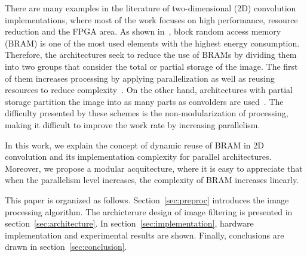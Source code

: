 \documentclass[conference,compsoc]{IEEEtran}
\begin{document}
There are many examples in the literature of two-dimensional (2D) convolution
implementations, where most of the work focuses on high performance, resource
reduction and the FPGA area. As shown in~\cite{paper3}, block random access
memory (BRAM) is one of the most used elements with the highest energy
consumption. Therefore, the architectures seek to reduce the use of BRAMs by
dividing them into two groups that consider the total or partial storage of the
image. The first of them increases processing by applying parallelization as
well as reusing resources to reduce complexity~\cite{paper1,paper5}. On the
other hand, architectures with partial storage partition the image into as many
parts as convolders are used~\cite{paper2,paper4}. The difficulty presented by
these schemes is the non-modularization of processing, making it difficult to
improve the work rate by increasing parallelism.

In this work, we explain the concept of dynamic reuse of BRAM in 2D convolution
and its implementation complexity for parallel architectures. Moreover, we
propose a modular acquitecture, where it is easy to appreciate that when the
parallelism level increases, the complexity of BRAM increases linearly.

This paper is organized as follows. Section~\ref{sec:preproc} introduces the
image processing algorithm. The archicterure design of image filtering is
presented in section~\ref{sec:architecture}. In
section~\ref{sec:implementation}, hardware implementation and experimental
results are shown. Finally, conclusions are drawn in
section~\ref{sec:conclusion}.

%
%
%
%
%
% 
\end{document}

